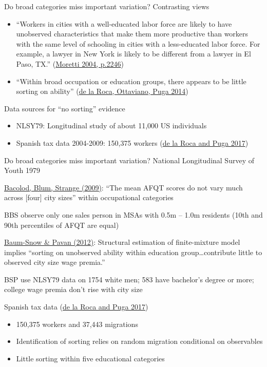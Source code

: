 \documentclass[10pt,notes=hide]{beamer}
\begin{document}
\begin{frame}{Do broad categories miss important variation?}
Contrasting views
\begin{itemize}
	\item  ``Workers in cities with a well-educated labor force are likely to have unobserved characteristics that make them more productive than workers with the same level of schooling in cities with a less-educated labor force. For example, a lawyer in New York is likely to be different from a lawyer in El Paso, TX.'' (\href{https://ideas.repec.org/h/eee/regchp/4-51.html}{Moretti 2004, p.2246})
	\item ``Within broad occupation or education groups, there appears to be little sorting on ability'' (\href{http://diegopuga.org/research/dreams.pdf}{de la Roca, Ottaviano, Puga 2014})
\end{itemize}
Data sources for ``no sorting'' evidence
\begin{itemize}
	\item NLSY79: Longitudinal study of about 11,000 US individuals
	\item Spanish tax data 2004-2009: 150,375 workers (\href{https://academic.oup.com/restud/article/84/1/106/2669971}{de la Roca and Puga 2017})
\end{itemize}
\end{frame}
\begin{frame}{Do broad categories miss important variation?}
National Longitudinal Survey of Youth 1979
\begin{itemize}
{\small	\item \href{http://econpapers.repec.org/article/eeejuecon/v_3a65_3ay_3a2009_3ai_3a2_3ap_3a136-153.htm}{Bacolod, Blum, Strange (2009)}: ``The mean AFQT scores do not vary much across [four] city sizes'' within occupational categories
	\item BBS observe only one sales person in MSAs with 0.5m -- 1.0m residents (10th and 90th percentiles of AFQT are equal) \hyperlink{BBS2009tab5}{}
	\item \href{https://ideas.repec.org/a/oup/restud/v79y2012i1p88-127.html}{Baum-Snow \& Pavan (2012)}: Structural estimation of finite-mixture model implies ``sorting on unobserved ability within education group\dots contribute little to observed city size wage premia.''
	\item BSP use NLSY79 data on 1754 white men; 583 have bachelor's degree or more; college wage premia don't rise with city size \hyperlink{BSPvsCensus}{}
}
\end{itemize} 
Spanish tax data (\href{https://academic.oup.com/restud/article/84/1/106/2669971}{de la Roca and Puga 2017})
\begin{itemize}
	\item 150,375 workers and 37,443 migrations
	\item Identification of sorting relies on random migration conditional on observables
	\item Little sorting within five educational categories
\end{itemize}
\hypertarget{NLSY_main}{}
\end{frame}
\end{document}
